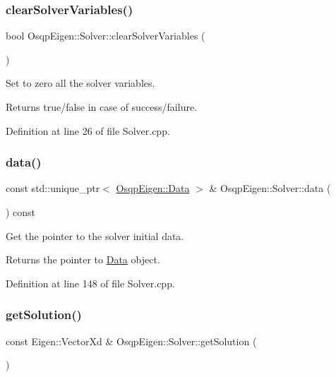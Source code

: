 \subsubsection{\texorpdfstring{clear\+Solver\+Variables()}{clearSolverVariables()}}
{\footnotesize\ttfamily bool Osqp\+Eigen\+::\+Solver\+::clear\+Solver\+Variables (\begin{DoxyParamCaption}{ }\end{DoxyParamCaption})}



Set to zero all the solver variables. 

\begin{DoxyReturn}{Returns}
true/false in case of success/failure. 
\end{DoxyReturn}


Definition at line 26 of file Solver.\+cpp.

\mbox{\label{classOsqpEigen_1_1Solver_a2d93b3aae416bc29abe5fb1db16333e0}} 
\subsubsection{\texorpdfstring{data()}{data()}}
{\footnotesize\ttfamily const std\+::unique\+\_\+ptr$<$ \mbox{\hyperlink{classOsqpEigen_1_1Data}{Osqp\+Eigen\+::\+Data}} $>$ \& Osqp\+Eigen\+::\+Solver\+::data (\begin{DoxyParamCaption}{ }\end{DoxyParamCaption}) const}



Get the pointer to the solver initial data. 

\begin{DoxyReturn}{Returns}
the pointer to \mbox{\hyperlink{classOsqpEigen_1_1Data}{Data}} object. 
\end{DoxyReturn}


Definition at line 148 of file Solver.\+cpp.

\mbox{\label{classOsqpEigen_1_1Solver_a192a5f94034d4e467c6b557c2e06dd66}} 
\subsubsection{\texorpdfstring{get\+Solution()}{getSolution()}}
{\footnotesize\ttfamily const Eigen\+::\+Vector\+Xd \& Osqp\+Eigen\+::\+Solver\+::get\+Solution (\begin{DoxyParamCaption}{ }\end{DoxyParamCaption})}



